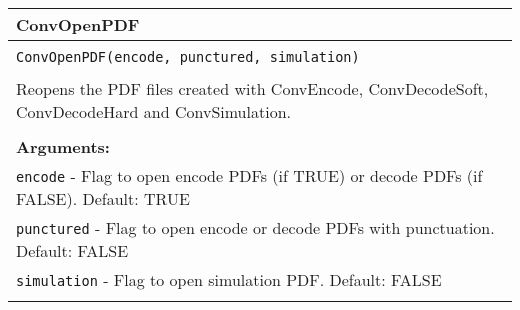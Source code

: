 \begin{longtable}{|p{\textwidth}|}
\hline
\rowcolor{lightblue}ConvOpenPDF\\
\hline
\\
\texttt{ConvOpenPDF(encode, punctured, simulation)}\\
\\
Reopens the PDF files created with ConvEncode, ConvDecodeSoft, ConvDecodeHard and ConvSimulation.\\
\\
\textbf{Arguments:}\\
\texttt{encode} - Flag to open encode PDFs (if TRUE) or decode PDFs (if FALSE). Default: TRUE\\
\texttt{punctured} - Flag to open encode or decode PDFs with punctuation. Default: FALSE\\
\texttt{simulation} - Flag to open simulation PDF. Default: FALSE\\
\\
\hline
\end{longtable}